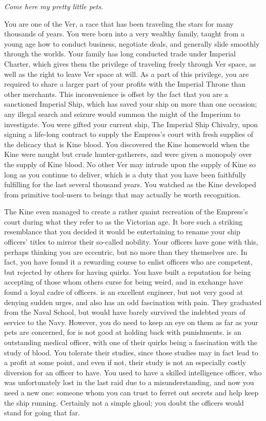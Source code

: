 \documentclass[char]{guildcamp4}
\begin{document}
\name{\cVone{}}


\textit{Come here my pretty little pets.}

You are one of the Ver, a race that has been traveling the stars for many thousands of years. You were born into a very wealthy family, taught from a young age how to conduct business, negotiate deals, and generally slide smoothly through the worlds. Your family has long conducted trade under Imperial Charter, which gives them the privilege of traveling freely through Ver space, as well as the right to leave Ver space at will. As a part of this privilege, you are required to share a larger part of your profits with the Imperial Throne than other merchants. This inconvenience is offset by the fact that you are a sanctioned Imperial Ship, which has saved your ship on more than one occasion; any illegal search and seizure would summon the might of the Imperium to investigate. You were gifted your current ship, The Imperial Ship Chivalry, upon signing a life-long contract to supply the Empress's court with fresh supplies of the delicacy that is Kine blood. You discovered the Kine homeworld when the Kine were naught but crude hunter-gatherers, and were given a monopoly over the supply of Kine blood. No other Ver may intrude upon the supply of Kine so long as you continue to deliver, which is a duty that you have been faithfully fulfilling for the last several thousand years. You watched as the Kine developed from primitive tool-users to beings that may actually be worth recognition. 

The Kine even managed to create a rather quaint recreation of the Empress's court during what they refer to as the Victorian age. It bore such a striking resemblance that you decided it would be entertaining to rename your ship officers' titles to mirror their so-called nobility. Your officers have gone with this, perhaps thinking you are eccentric, but no more than they themselves are. In fact, you have found it a rewarding course to enlist officers who are competent, but rejected by others for having quirks. You have built a reputation for being accepting of those whom others curse for being weird, and in exchange have found a loyal cadre of officers. \cVtwo{} is an excellent engineer, but not very good at denying sudden urges, and also has an odd fascination with pain. They graduated from the Naval School, but would have barely survived the indebted years of service to the Navy. However, you do need to keep an eye on them as far as your pets are concerned, for \cVtwo{} is not good at holding back with punishments. \cVthree{} is an outstanding medical officer, with one of their quirks being a fascination with the study of blood. You tolerate their studies, since those studies may in fact lead to a profit at some point, and even if not, their study is not an especially costly diversion for an officer to have. You used to have a skilled intelligence officer, who was unfortunately lost in the last raid due to a misunderstanding, and now you need a new one: someone whom you can trust to ferret out secrets and help keep the ship running. Certainly not a simple ghoul; you doubt the officers would stand for going that far.
\end{document}
